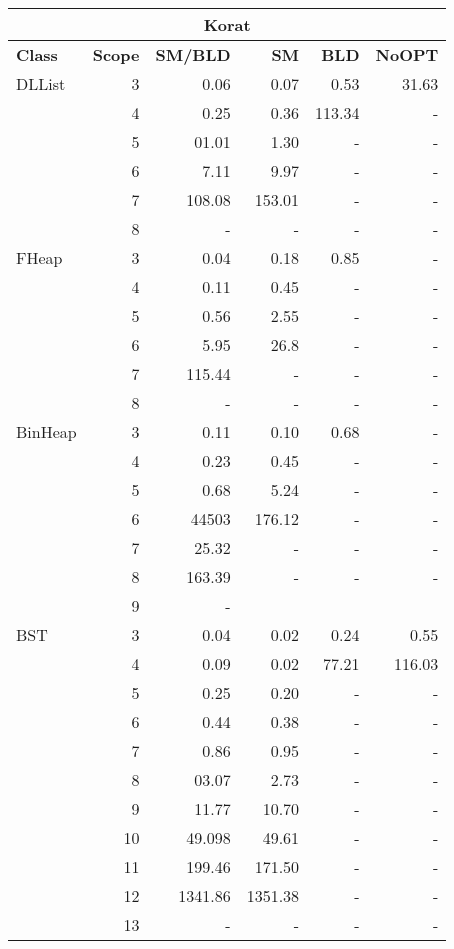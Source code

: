 \begin{table}[H]
\scriptsize

\centering
\label{tab:results-obj1}
\begin{tabular}{ l r | r | r | r | r  }
  \toprule
  \multicolumn{6}{c}{\textbf{Korat}} \\
  \midrule 
  \textbf{Class} & \textbf{Scope} & \textbf{SM/BLD} & \textbf{SM}  & \textbf{BLD} & \textbf{NoOPT}  \\
  \midrule
  DLList
&	3	&	0.06	&	0.07	&	0.53	&	31.63	\\
&	4	&	0.25	&	0.36	&	113.34	&	-	\\
&	5	&	01.01	&	1.30	&	-	&	-	\\
&	6	&	7.11	&	9.97	&	-	&	-	\\
&	7	&	108.08	&	153.01	&	-	&	-	\\
&	8	&	-	&	-	&	-	&	-	\\
  \midrule
  FHeap
&	3	&	0.04	&	0.18	&	0.85	&	-	\\
&	4	&	0.11	&	0.45	&	-	&	-	\\
&	5	&	0.56	&	2.55	&	-	&	-	\\
&	6	&	5.95	&	26.8	&	-	&	-	\\
&	7	&	115.44	&	-	&	-	&	-	\\
&	8	&	-	&	-	&	-	&	-	\\
  \midrule
  BinHeap
&	3	&	0.11	&	0.10	&	0.68	&	-	\\
&	4	&	0.23	&	0.45	&	-	&	-	\\
&	5	&	0.68	&	5.24	&	-	&	-	\\
&	6	&	44503	&	176.12	&	-	&	-	\\
&	7	&	25.32	&	-	&	-	&	-	\\
&	8	&	163.39	&	-	&	-	&	-	\\
&	9	&	-	&		&		&		\\
  \midrule
  BST
&	3	&	0.04	&	0.02	&	0.24	&	0.55	\\
&	4	&	0.09	&	0.02	&	77.21	&	116.03	\\
&	5	&	0.25	&	0.20	&	-	&	-	\\
&	6	&	0.44	&	0.38	&	-	&	-	\\
&	7	&	0.86	&	0.95	&	-	&	-	\\
&	8	&	03.07	&	2.73	&	-	&	-	\\
&	9	&	11.77	&	10.70	&	-	&	-	\\
&	10	&	49.098	&	49.61	&	-	&	-	\\
&	11	&	199.46	&	171.50	&	-	&	-	\\
&	12	&	1341.86	&	1351.38	&	-	&	-	\\
&	13	&	-	&	-	&	-	&	-	\\

\end{tabular}
\end{table}
